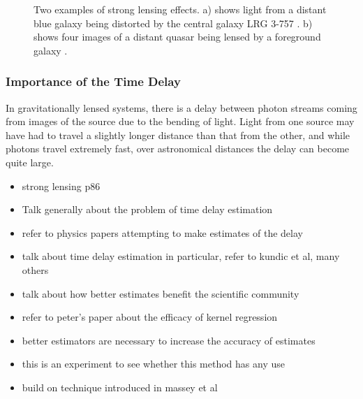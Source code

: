 \documentclass[a4paper,11pt]{article}
\begin{document}
\begin{figure}
\centering
{}
\qquad
{}
\caption{Two examples of strong lensing effects. a) shows light from
a distant blue galaxy being distorted by the central galaxy LRG 3-757
\cite{einsteinring}. b) shows four images of a distant quasar being lensed by a
foreground galaxy \cite{eincross}.}
\label{fig:stronglens}
\end{figure}
\subsubsection{Importance of the Time Delay}
\label{sec-2-1-1}

In gravitationally lensed systems, there is a delay between photon streams
coming from images of the source due to the bending of light. Light from one
source may have had to travel a slightly longer distance than that from the
other, and while photons travel extremely fast, over astronomical distances the
delay can become quite large. 
\begin{itemize}
\item strong lensing p86
\item Talk generally about the problem of time delay estimation
\item refer to physics papers attempting to make estimates of the delay
\item talk about time delay estimation in particular, refer to kundic et al, many others
\item talk about how better estimates benefit the scientific community
\item refer to peter's paper about the efficacy of kernel regression
\item better estimators are necessary to increase the accuracy of estimates
\item this is an experiment to see whether this method has any use
\item build on technique introduced in massey et al
\end{itemize}
\end{document}
